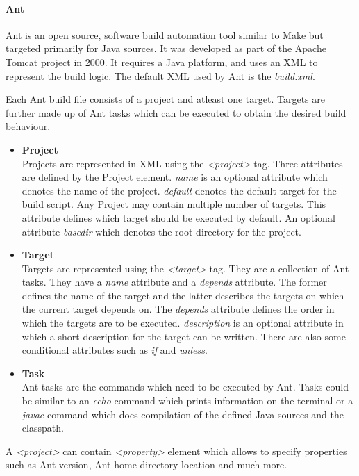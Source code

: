 \documentclass[12pt, a4paper, titlepage]{scrartcl}
\newcommand{\courierword}[1]{\textsf{\itshape #1}}{\fontfamily{pcr}\selectfont}%
\begin{document}
\paragraph{Ant}
\par Ant\cite{ant2004apache} is an open source, software build automation tool similar to Make but targeted primarily for Java sources. It was developed as part of the Apache Tomcat project in 2000. It requires a Java platform, and uses an XML to represent the build logic. The default XML used by Ant is the \courierword{build.xml}. 
\par Each Ant build file consists of a project and atleast one target. Targets are further made up of Ant tasks which can be executed to obtain the desired build behaviour. \\
\begin{itemize}
\item {\textbf{Project}}\\
Projects are represented in XML using the \textit{\textless project\textgreater}  tag. Three attributes are defined by the Project element. \textit{name} is an optional attribute which denotes the name of the project. \textit{default} denotes the default target for the build script. Any Project may contain multiple number of targets. This attribute defines which target should be executed by default. An optional attribute \textit{basedir} which denotes the root directory for the project. 
\item {\textbf{Target}} \\
Targets are represented using the \textit{\textless target\textgreater}  tag. They are a collection of Ant tasks. They have a \textit{name} attribute and a \textit{depends} attribute. The former defines the name of the target and the latter describes the targets on which the current target depends on. The \textit{depends} attribute defines the order in which the targets are to be executed\cite{williamson2002ant}. \textit{description} is an optional attribute in which a short description for the target can be written. There are also some conditional attributes such as \textit{if} and \textit{unless}.  
\item {\textbf{Task}}\\
Ant tasks are the commands which need to be executed by Ant. Tasks could be similar to an \courierword{echo} command which prints information on the terminal or a \courierword{javac} command which does compilation of the defined Java sources and the classpath. 
\end{itemize}
\par A \textit{\textless project\textgreater} can contain \textit{\textless property\textgreater} element which allows to specify properties such as Ant version, Ant home directory location and much more. 
\end{document}
